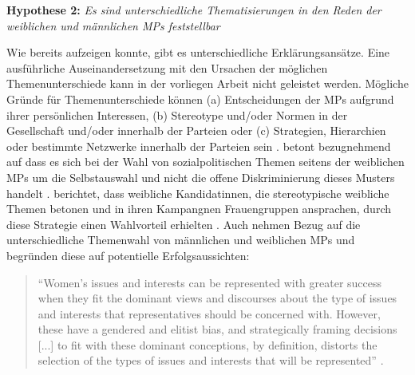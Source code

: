 \documentclass[12pt, 
    twoside=false, 
    bibliography=totoc, 
    numbers=endperiod, 
    headings=normal, 
    toc=chapterentrydotfill
    ]{scrbook}
\begin{document}
\textbf{Hypothese 2:} \emph{Es sind unterschiedliche Thematisierungen in den Reden der weiblichen und männlichen MPs feststellbar}

Wie \textcite{back_2014} bereits aufzeigen konnte, gibt es unterschiedliche Erklärungsansätze. Eine ausführliche Auseinandersetzung mit den Ursachen der möglichen Themenunterschiede kann in der vorliegen Arbeit nicht geleistet werden. Mögliche Gründe für Themenunterschiede können (a) Entscheidungen der MPs aufgrund ihrer persönlichen Interessen, (b) Stereotype und/oder Normen in der Gesellschaft und/oder innerhalb der Parteien oder (c) Strategien, Hierarchien oder bestimmte Netzwerke innerhalb der Parteien sein \parencites[507]{back_2014}. \textcite [250]{ennser-jedenastik_2017} betont bezugnehmend auf \textcites{baekgaard_2012}{thomas_1994} dass es sich bei der Wahl von sozialpolitischen Themen seitens der weiblichen MPs um die Selbstauswahl und nicht die offene Diskriminierung dieses Musters handelt \parencite[250]{ennser-jedenastik_2017}. \textcite{herrnson_2003} berichtet, dass weibliche Kandidatinnen, die stereotypische weibliche Themen betonen und in ihren Kampangnen Frauengruppen ansprachen, durch diese Strategie einen Wahlvorteil erhielten \parencite[250]{ennser-jedenastik_2017}. Auch \textcite{celis_2018} nehmen Bezug auf die unterschiedliche Themenwahl von männlichen und weiblichen MPs und begründen diese auf potentielle Erfolgsaussichten:


\citereset
\begin{quote}
    \enquote{Women’s issues and interests can be represented with greater success when they fit the dominant views and discourses about the type of issues and interests that representatives should be concerned with. However, these have a gendered and elitist bias, and strategically framing decisions [...] to fit with these dominant conceptions, by definition, distorts the selection of the types of issues and interests that will be represented} \parencite[151]{celis_2018}.
\end{quote}
\end{document}
